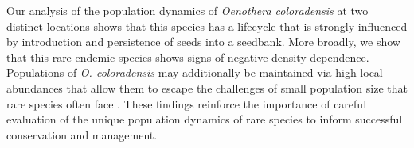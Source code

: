 \documentclass[12pt, letterpaper]{article}
\begin{document}

Our analysis of the population dynamics of \textit{Oenothera coloradensis} at two distinct locations shows that this species has a lifecycle that is strongly influenced by introduction and persistence of seeds into a seedbank. More broadly, we show that this rare endemic species shows signs of negative density dependence. Populations of \textit{O. coloradensis} may additionally be maintained via high local abundances that allow them to escape the challenges of small population size that rare species often face \cite{Rabinowitz1981SevenRarity}. These findings reinforce the importance of careful evaluation of the unique population dynamics of rare species to inform successful conservation and management.  
\end{document}

